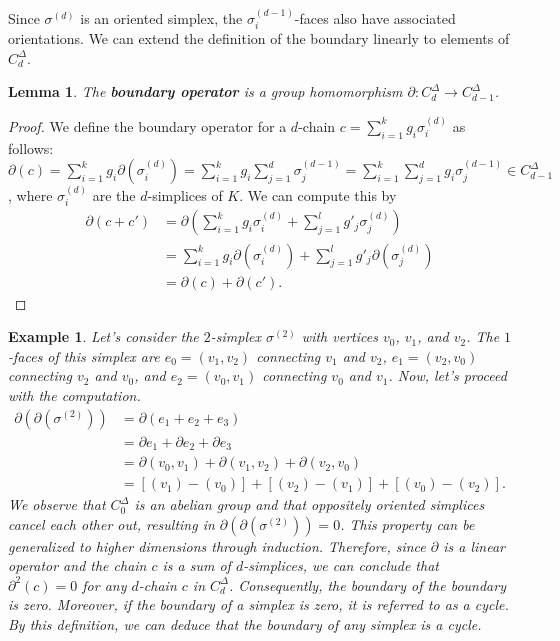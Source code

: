 \documentclass{amsart}
\newtheorem{lemma}[definition]{Lemma}
\newtheorem{example}[definition]{Example}
\begin{document}
Since $\sigma^{(d)}$ is an oriented simplex, the $\sigma^{(d-1)}_i$-faces also have associated orientations. We can extend the definition of the boundary linearly to elements of $C^\Delta_d$.

\begin{lemma}
The \textbf{boundary operator} is a group homomorphism $\partial: C^\Delta_d \rightarrow C^\Delta_{d-1}$.
\end{lemma}
\begin{proof}
We define the boundary operator for a $d$-chain $c = \sum_{i=1}^{k} g_i \sigma_i^{(d)}$ as follows: $\partial(c) = \sum_{i=1}^{k} g_i \partial(\sigma_i^{(d)}) = \sum_{i=1}^{k} g_i \sum_{j=1}^{d} \sigma_j^{(d-1)} = \sum_{i=1}^{k} \sum_{j=1}^{d} g_i \sigma_j^{(d-1)} \in C^\Delta_{d-1}$, where $\sigma_i^{(d)}$ are the $d$-simplices of $K$. We can compute this by
\begin{align}
\partial(c + c') &= \partial(\sum_{i=1}^{k} g_i \sigma_i^{(d)} + \sum_{j=1}^{l} g'_j \sigma_j^{(d)}) \\
&= \sum_{i=1}^{k} g_i \partial(\sigma_i^{(d)}) + \sum_{j=1}^{l} g'_j \partial(\sigma_j^{(d)}) \\
&= \partial(c) + \partial(c').
\end{align}
\end{proof}

\begin{example}
Let's consider the $2$-simplex $\sigma^{(2)}$ with vertices $v_0$, $v_1$, and $v_2$. The $1$-faces of this simplex are $e_0 = (v_1,v_2)$ connecting $v_1$ and $v_2$, $e_1 = (v_2,v_0)$ connecting $v_2$ and $v_0$, and $e_2 = (v_0,v_1)$ connecting $v_0$ and $v_1$. Now, let's proceed with the computation.
\begin{align}
\partial(\partial(\sigma^{(2)})) &= \partial (e_1+e_2+e_3) \\
&= \partial e_1 + \partial e_2 + \partial e_3 \\
&= \partial(v_0,v_1) + \partial(v_1,v_2) + \partial(v_2,v_0) \\
&= [(v_1)-(v_0)] + [(v_2)-(v_1)]+[(v_0)-(v_2)].
\end{align}
We observe that $C^\Delta_0$ is an abelian group and that oppositely oriented simplices cancel each other out, resulting in $\partial(\partial(\sigma^{(2)})) = 0$. This property can be generalized to higher dimensions through induction. Therefore, since $\partial$ is a linear operator and the chain $c$ is a sum of $d$-simplices, we can conclude that $\partial^2(c) = 0$ for any $d$-chain $c$ in $C^\Delta_d$. Consequently, the boundary of the boundary is zero. Moreover, if the boundary of a simplex is zero, it is referred to as a \emph{cycle}. By this definition, we can deduce that the boundary of any simplex is a cycle.
\end{example}
\end{document}
